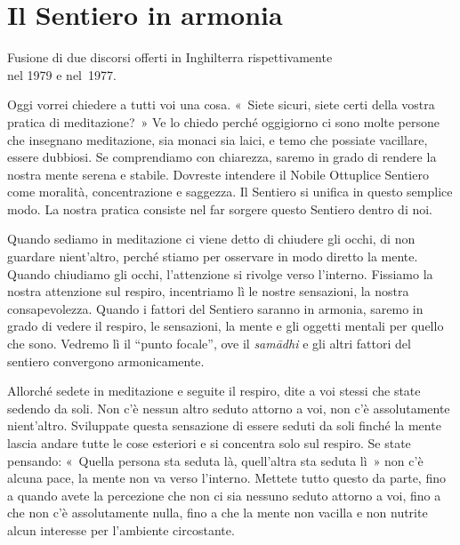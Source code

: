 \chapter{Il Sentiero in armonia}

\begin{openingQuote}
  \centering

  Fusione di due discorsi offerti in Inghilterra rispettivamente\\
  nel 1979 e nel~1977.
\end{openingQuote}

Oggi vorrei chiedere a tutti voi una cosa. «~Siete sicuri, siete certi
della vostra pratica di meditazione?~» Ve lo chiedo perché oggigiorno ci
sono molte persone che insegnano meditazione, sia monaci sia laici, e
temo che possiate vacillare, essere dubbiosi. Se comprendiamo con
chiarezza, saremo in grado di rendere la nostra mente serena e stabile.
Dovreste intendere il Nobile Ottuplice Sentiero come moralità,
concentrazione e saggezza. Il Sentiero si unifica in questo semplice
modo. La nostra pratica consiste nel far sorgere questo Sentiero dentro
di noi.

Quando sediamo in meditazione ci viene detto di chiudere gli occhi, di
non guardare nient'altro, perché stiamo per osservare in modo diretto la
mente. Quando chiudiamo gli occhi, l'attenzione si rivolge verso
l'interno. Fissiamo la nostra attenzione sul respiro, incentriamo lì le
nostre sensazioni, la nostra consapevolezza. Quando i fattori del
Sentiero saranno in armonia, saremo in grado di vedere il respiro, le
sensazioni, la mente e gli oggetti mentali per quello che sono. Vedremo
lì il ``punto focale'', ove il \emph{samādhi} e gli altri fattori del
sentiero convergono armonicamente.

Allorché sedete in meditazione e seguite il respiro, dite a voi stessi
che state sedendo da soli. Non c'è nessun altro seduto attorno a voi,
non c'è assolutamente nient'altro. Sviluppate questa sensazione di
essere seduti da soli finché la mente lascia andare tutte le cose
esteriori e si concentra solo sul respiro. Se state pensando: «~Quella
persona sta seduta là, quell'altra sta seduta lì~» non c'è alcuna pace,
la mente non va verso l'interno. Mettete tutto questo da parte, fino a
quando avete la percezione che non ci sia nessuno seduto attorno a voi,
fino a che non c'è assolutamente nulla, fino a che la mente non vacilla
e non nutrite alcun interesse per l'ambiente circostante.

